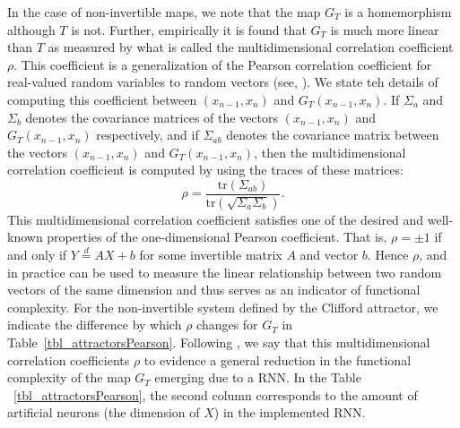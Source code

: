 \documentclass[a4paper,12pt,twoside]{report}
\begin{document}




In the case of non-invertible maps, we note that the map $G_T$ is a homemorphism although $T$ is not. Further, empirically it is found that $G_T$ is much more linear than $T$ as measured by what is called the multidimensional correlation coefficient $\rho$. This coefficient is a generalization of the Pearson correlation coefficient for real-valued random variables to random vectors (see, \cite{puccetti2019measuring}). We state teh details of computing this coefficient between 
$(x_{n-1},x_n)$ and $G_T(x_{n-1},x_n)$. 
If $\Sigma_{a}$ and $\Sigma_{b}$ denotes the covariance matrices of the vectors $(x_{n-1},x_n)$ and $G_T(x_{n-1},x_n)$ respectively, and if $\Sigma_{ab}$ denotes the covariance matrix between the vectors $(x_{n-1},x_n)$ and $G_T(x_{n-1},x_n)$, then the multidimensional correlation coefficient is computed by using the traces of these matrices:
\[
    \rho= \frac{\text{tr}({\Sigma_{ab}})}{\text{tr}({\sqrt{\Sigma_a\Sigma_b}})}.
\]
This multidimensional correlation coefficient satisfies one of the desired and well-known properties of the one-dimensional Pearson coefficient. That is, $\rho=\pm 1$ if and only if $Y\overset{d}{=}AX+b$ for some invertible matrix $A$ and vector $b$. Hence $\rho$, and in practice can be used  to measure the linear relationship between two random vectors of the same dimension and thus serves as an indicator of functional complexity. For the non-invertible system defined by the Clifford attractor, we indicate the difference by which $\rho$ changes for $G_T$ in Table~\ref{tbl_attractorsPearson}.
Following \cite{manjunath2021universal}, we say that this multidimensional correlation coefficients $\rho$ to evidence a general reduction in the functional complexity of the map $G_T$ emerging due to a RNN. In the 
Table ~\ref{tbl_attractorsPearson}, the second column corresponds to the amount of artificial neurons (the dimension of $X$) in the implemented RNN.
               
\end{document}
